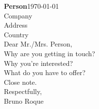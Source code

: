 \noindent
\textbf{Person}\hfill\today\\
Company\\
Address\\
Country\\
\newline
\newline
\noindent
Dear Mr./Mrs. Person,\\
\newline
\newline
Why are you getting in touch?\\
\newline
Why you're interested?\\
\newline
What do you have to offer?\\
\newline
Close note.\\
\newline
\newline
Respectfully,\\
Bruno Roque
